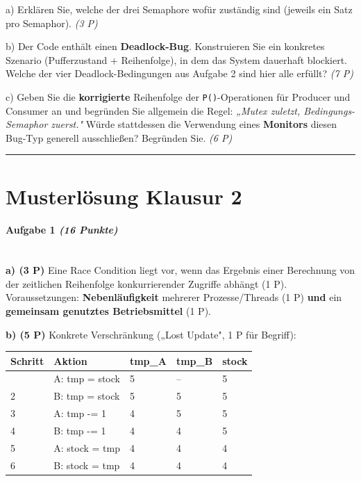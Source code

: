 \documentclass[11pt, a4paper]{article}
\begin{document}
a) Erklären Sie, welche der drei Semaphore wofür zuständig sind (jeweils ein Satz pro Semaphor). \textit{(3 P)}


b) Der Code enthält einen \textbf{Deadlock-Bug}. Konstruieren Sie ein konkretes Szenario (Pufferzustand + Reihenfolge), in dem das System dauerhaft blockiert. Welche der vier Deadlock-Bedingungen aus Aufgabe 2 sind hier alle erfüllt? \textit{(7 P)}


c) Geben Sie die \textbf{korrigierte} Reihenfolge der \texttt{P()}-Operationen für Producer und Consumer an und begründen Sie allgemein die Regel: \textit{„Mutex zuletzt, Bedingungs-Semaphor zuerst."} Würde stattdessen die Verwendung eines \textbf{Monitors} diesen Bug-Typ generell ausschließen? Begründen Sie. \textit{(6 P)}



\noindent\textcolor{rulegray}{\rule{\linewidth}{0.4pt}}



\section{Musterlösung Klausur 2}

\paragraph{Aufgabe 1 \textit{(16 Punkte)}}\mbox{}\\[2pt]

\textbf{a) (3 P)} Eine Race Condition liegt vor, wenn das Ergebnis einer Berechnung von der zeitlichen Reihenfolge konkurrierender Zugriffe abhängt (1 P). Voraussetzungen: \textbf{Nebenläufigkeit} mehrerer Prozesse/Threads (1 P) \textbf{und} ein \textbf{gemeinsam genutztes Betriebsmittel} (1 P).


\textbf{b) (5 P)} Konkrete Verschränkung („Lost Update", 1 P für Begriff):



{\small
\begin{tabularx}{\linewidth}{XXXXX}
\hline
\rowcolor{tableheadbg}
{\color{white}\textbf{Schritt}} & {\color{white}\textbf{Aktion}} & {\color{white}\textbf{tmp\_A}} & {\color{white}\textbf{tmp\_B}} & {\color{white}\textbf{stock}} \\[2pt]
\hline
\endhead
\hline
\endfoot
1 & A: tmp = stock & 5 & – & 5 \\
2 & B: tmp = stock & 5 & 5 & 5 \\
3 & A: tmp -= 1 & 4 & 5 & 5 \\
4 & B: tmp -= 1 & 4 & 4 & 5 \\
5 & A: stock = tmp & 4 & 4 & 4 \\
6 & B: stock = tmp & 4 & 4 & 4 \\
\end{tabularx}
}
\end{document}
